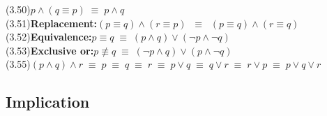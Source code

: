 \documentclass[12pt, fleqn, leqno]{article}
\newcommand{\lgap}{2pt}                             %
\newcommand{\equivs}{\ensuremath{\;\equiv\;}}       %
\newcommand{\equivss}{\ensuremath{\;\;\equiv\;\;}}  %
\newcommand{\nequiv}{\ensuremath{\not\equiv}}       %
\begin{document}
\begin{tabbing}
(3.50)\>$p\land (q\equiv p)\equivs p\land q$\\[\lgap]
(3.51)\>\textbf{Replacement:}\quad $(p \equiv q) \land (r \equiv p) \equivss (p \equiv q) \land (r \equiv q)$\\[\lgap]
(3.52)\>\textbf{Equivalence:}\quad $p \equiv q \equivs (p \land q) \lor (\neg p \land \neg q)$\\[\lgap]
(3.53)\>\textbf{Exclusive or:}\quad $p \nequiv q \equivs (\neg p \land q) \lor (p \land \neg q)$\\[\lgap]
(3.55)\>$(p\land q)\land r \equivs p \equivs q \equivs r \equivs p\lor q \equivs q\lor r \equivs r\lor p \equivs p \lor q\lor r$\\
\end{tabbing}


\subsection*{Implication}
\end{document}
